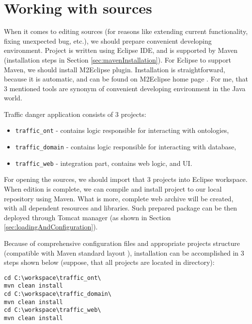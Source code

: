 \setlength{\parindent}{0in}	%

\chapter{Working with sources}
\label{cha:workingWithSources}

\indent When it comes to editing sources (for reasons like extending current functionality, fixing unexpected bug, etc.), we should prepare convenient developing environment. Project is written using Eclipse IDE, and is supported by Maven (installation steps in Section \ref{sec:mavenInstallation}). For Eclipse to support Maven, we should install M2Eclipse plugin. Installation is straightforward, because it is automatic, and can be found on M2Eclipse home page \cite{M2EclipseHome}. For me, that 3 mentioned tools are synonym of convenient developing environment in the Java world.

\bigskip

Traffic danger application consists of 3 projects:
\begin{itemize}
    \setlength{\itemsep}{0cm}
    \setlength{\parskip}{0cm}

    \item \texttt{traffic\_ont} - contains logic responsible for interacting with ontologies,
    \item \texttt{traffic\_domain} - contains logic responsible for interacting with database,
    \item \texttt{traffic\_web} - integration part, contains web logic, and UI.
\end{itemize}

\smallskip

For opening the sources, we should import that 3 projects into Eclipse workspace. When edition is complete, we can compile and install project to our local repository using Maven. What is more, complete web archive will be created, with all dependent resources and libraries. Such prepared package can be then deployed through Tomcat manager (as shown in Section \ref{sec:loadingAndConfiguration}).

\bigskip

Because of comprehensive configuration files and appropriate projects structure (compatible with Maven standard layout \cite{MavenStandardLayout}), installation can be accomplished in 3 steps shown below (suppose, that all projects are located in  directory):

\begin{verbatim}
cd C:\workspace\traffic_ont\
mvn clean install
cd C:\workspace\traffic_domain\
mvn clean install
cd C:\workspace\traffic_web\
mvn clean install
\end{verbatim}

